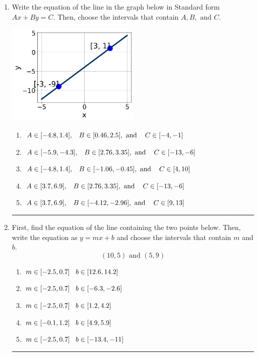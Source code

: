 \documentclass[14pt]{extbook}
\newcommand{\litem}[1]{\item#1\hspace*{-1cm}\rule{\textwidth}{0.4pt}}
\begin{document}
\begin{enumerate}
{\begin{enumerate}[label=\Alph*.]
\end{enumerate} }
\litem{
Write the equation of the line in the graph below in Standard form $Ax+By=C$. Then, choose the intervals that contain $A, B, \text{ and } C$.
\begin{center}
    \includegraphics[width=0.5\textwidth]{../Figures/linearGraphToStandardB.png}
\end{center}
\begin{enumerate}[label=\Alph*.]
\item \( A \in [-4.8, 1.4], \hspace{3mm} B \in [0.46, 2.5], \text{ and } \hspace{3mm} C \in [-4, -1] \)
\item \( A \in [-5.9, -4.3], \hspace{3mm} B \in [2.76, 3.35], \text{ and } \hspace{3mm} C \in [-13, -6] \)
\item \( A \in [-4.8, 1.4], \hspace{3mm} B \in [-1.06, -0.45], \text{ and } \hspace{3mm} C \in [4, 10] \)
\item \( A \in [3.7, 6.9], \hspace{3mm} B \in [2.76, 3.35], \text{ and } \hspace{3mm} C \in [-13, -6] \)
\item \( A \in [3.7, 6.9], \hspace{3mm} B \in [-4.12, -2.96], \text{ and } \hspace{3mm} C \in [9, 13] \)

\end{enumerate} }
\litem{
First, find the equation of the line containing the two points below. Then, write the equation as $ y=mx+b $ and choose the intervals that contain $m$ and $b$.\[ (10, 5) \text{ and } (5, 9) \]\begin{enumerate}[label=\Alph*.]
\item \( m \in [-2.5, 0.7] \hspace*{3mm} b \in [12.6, 14.2] \)
\item \( m \in [-2.5, 0.7] \hspace*{3mm} b \in [-6.3, -2.6] \)
\item \( m \in [-2.5, 0.7] \hspace*{3mm} b \in [1.2, 4.2] \)
\item \( m \in [-0.1, 1.2] \hspace*{3mm} b \in [4.9, 5.9] \)
\item \( m \in [-2.5, 0.7] \hspace*{3mm} b \in [-13.4, -11] \)


\end{enumerate}}
\end{enumerate}
\end{document}
